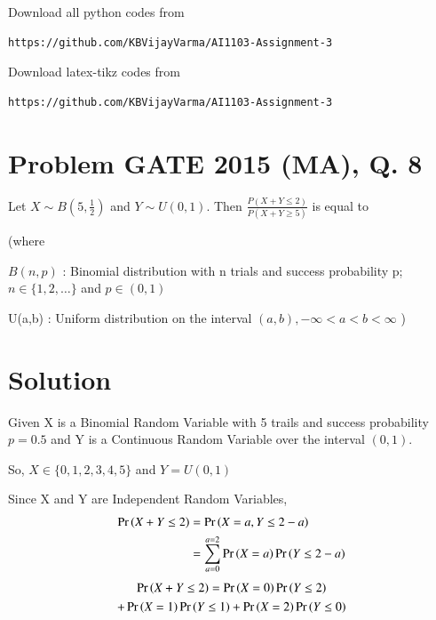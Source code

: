 \documentclass[journal,12pt,twocolumn]{IEEEtran}
\begin{document}
Download all python codes from 
\begin{lstlisting}
https://github.com/KBVijayVarma/AI1103-Assignment-3
\end{lstlisting}
%
Download latex-tikz codes from 
%
\begin{lstlisting}
https://github.com/KBVijayVarma/AI1103-Assignment-3
\end{lstlisting}
\section*{\textbf{Problem GATE 2015 (MA), Q. 8}}
Let $X \sim B(5,\frac{1}{2})$ and $Y \sim U(0,1)$. Then $\frac{P(X + Y \leq 2)}{P(X + Y \geq 5)}$ is equal to 

(where 

$B(n,p)$ : Binomial distribution with n trials and success probability p; $n \in \{1,2, \dots \}$ and  $p \in (0,1)$

U(a,b) : Uniform distribution on the interval $(a,b), -\infty < a < b < \infty$  )
\section*{\textbf{Solution}}
Given X is a Binomial Random Variable with 5 trails and success probability $p=0.5$ and Y is a Continuous Random Variable over the interval $(0,1)$.

So, $X \in \{0,1,2,3,4,5\}$ and $Y = U(0,1)$

Since X and Y are Independent Random Variables,
\begin{align}
\Pr\left(X + Y \leq 2\right) &= \Pr\left(X = a, Y \leq 2-a\right) \\
&= \sum_{a = 0}^{a = 2} \Pr\left(X = a\right)\Pr\left(Y \leq 2-a\right) 
\end{align}
\begin{multline}
\Pr\left(X + Y \leq 2\right) = \Pr\left(X = 0\right)\Pr\left(Y \leq 2\right) \label{0.0.3} \\ 
+ \Pr\left(X = 1\right)\Pr\left(Y \leq 1\right) + \Pr\left(X = 2\right)\Pr\left(Y \leq 0\right)    
\end{multline}
\end{document}
